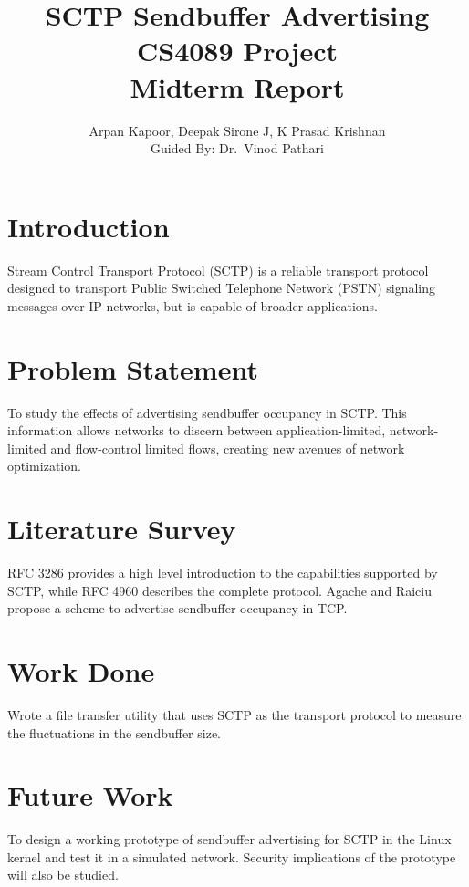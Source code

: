 \documentclass[a4paper,11pt,twocolumn]{article}
\title{SCTP Sendbuffer Advertising\\
	{\normalsize CS4089 Project\\
		Midterm Report}}
\author{Arpan Kapoor, Deepak Sirone J, K Prasad Krishnan\\
	Guided By: Dr.~Vinod Pathari}
\begin{document}
\maketitle

\section{Introduction}
Stream Control Transport Protocol (SCTP) is a reliable transport protocol
designed to transport Public Switched Telephone Network (PSTN) signaling
messages over IP networks, but is capable of broader applications.

\section{Problem Statement}
To study the effects of advertising sendbuffer occupancy in SCTP. This
information allows networks to discern between application-limited,
network-limited and flow-control limited flows, creating new avenues of network
optimization.

\section{Literature Survey}
RFC 3286 \cite{rfc3286} provides a high level introduction to the capabilities
supported by SCTP, while RFC 4960 \cite{rfc4960} describes the complete
protocol. Agache and Raiciu \cite{tcp-sndbufadv} propose a scheme to advertise
sendbuffer occupancy in TCP.

\section{Work Done}
Wrote a file transfer utility that uses SCTP as the transport protocol to
measure the fluctuations in the sendbuffer size.

\section{Future Work}
To design a working prototype of sendbuffer advertising for SCTP in the Linux
kernel and test it in a simulated network. Security implications of the
prototype will also be studied.

\printbibliography
\end{document}
